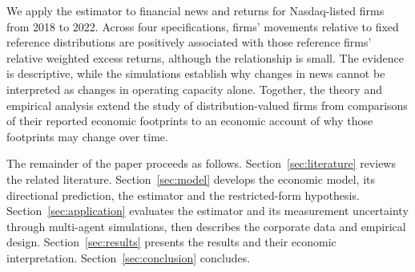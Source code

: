 We apply the estimator to financial news and returns for 
Nasdaq-listed firms from 2018 to 2022.
Across four specifications, firms' movements relative to fixed reference
distributions are positively associated with those reference firms' relative
weighted excess returns, although the relationship is small.
The evidence is descriptive, while the simulations establish why changes in
news cannot be interpreted as changes in operating capacity alone.
Together, the theory and empirical analysis extend the study of
distribution-valued firms from comparisons of their reported economic
footprints to an economic account of why those footprints may change over time.

The remainder of the paper proceeds as follows.
Section~\ref{sec:literature} reviews the related literature.
Section~\ref{sec:model} develops the economic model, its directional
prediction, the estimator and the restricted-form hypothesis.
Section~\ref{sec:application} evaluates the estimator and its measurement
uncertainty through multi-agent simulations, then describes the corporate data
and empirical design.
Section~\ref{sec:results} presents the results and their economic interpretation.
Section~\ref{sec:conclusion} concludes.
